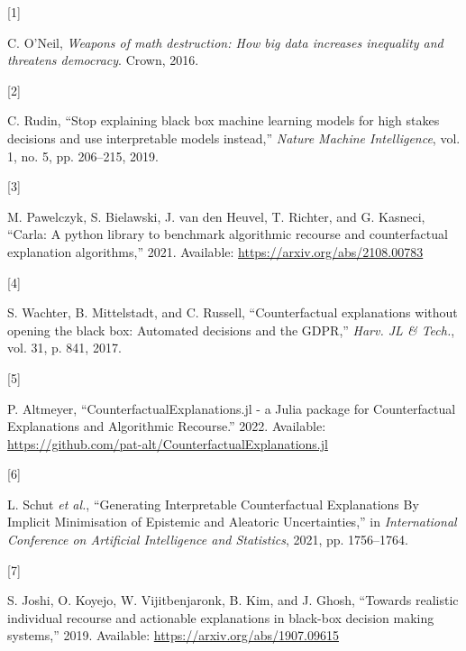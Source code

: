 \documentclass[conference,final,]{IEEEtran}
\newlength{\cslhangindent}
\newlength{\csllabelwidth}
\newlength{\cslentryspacingunit} %
\newenvironment{CSLReferences}[2] %
 {%
  \setlength{\parindent}{0pt}
  \ifodd #1
  \let\oldpar\par
  \def\par{\hangindent=\cslhangindent\oldpar}
  \fi
  \setlength{\parskip}{#2\cslentryspacingunit}
 }%
 {}
\newcommand{\CSLLeftMargin}[1]{\parbox[t]{\csllabelwidth}{#1}}
\newcommand{\CSLRightInline}[1]{\parbox[t]{\linewidth - \csllabelwidth}{#1}\break}
\theoremstyle{definition}
\theoremstyle{definition}
\theoremstyle{definition}
\theoremstyle{definition}
\theoremstyle{remark}
\begin{document}
\hypertarget{refs}{}
\begin{CSLReferences}{0}{0}
\leavevmode{}%
\CSLLeftMargin{{[}1{]} }%
\CSLRightInline{C. O'Neil, \emph{Weapons of math destruction: {How} big data increases inequality and threatens democracy}. {Crown}, 2016.}

\leavevmode{}%
\CSLLeftMargin{{[}2{]} }%
\CSLRightInline{C. Rudin, {``Stop explaining black box machine learning models for high stakes decisions and use interpretable models instead,''} \emph{Nature Machine Intelligence}, vol. 1, no. 5, pp. 206--215, 2019.}

\leavevmode{}%
\CSLLeftMargin{{[}3{]} }%
\CSLRightInline{M. Pawelczyk, S. Bielawski, J. van den Heuvel, T. Richter, and G. Kasneci, {``Carla: A python library to benchmark algorithmic recourse and counterfactual explanation algorithms,''} 2021. Available: \url{https://arxiv.org/abs/2108.00783}}

\leavevmode{}%
\CSLLeftMargin{{[}4{]} }%
\CSLRightInline{S. Wachter, B. Mittelstadt, and C. Russell, {``Counterfactual explanations without opening the black box: {Automated} decisions and the {GDPR},''} \emph{Harv. JL \& Tech.}, vol. 31, p. 841, 2017.}

\leavevmode{}%
\CSLLeftMargin{{[}5{]} }%
\CSLRightInline{P. Altmeyer, {``{CounterfactualExplanations}.jl - a {Julia} package for {Counterfactual Explanations} and {Algorithmic Recourse}.''} 2022. Available: \url{https://github.com/pat-alt/CounterfactualExplanations.jl}}

\leavevmode{}%
\CSLLeftMargin{{[}6{]} }%
\CSLRightInline{L. Schut \emph{et al.}, {``Generating {Interpretable Counterfactual Explanations By Implicit Minimisation} of {Epistemic} and {Aleatoric Uncertainties},''} in \emph{International {Conference} on {Artificial Intelligence} and {Statistics}}, 2021, pp. 1756--1764.}

\leavevmode{}%
\CSLLeftMargin{{[}7{]} }%
\CSLRightInline{S. Joshi, O. Koyejo, W. Vijitbenjaronk, B. Kim, and J. Ghosh, {``Towards realistic individual recourse and actionable explanations in black-box decision making systems,''} 2019. Available: \url{https://arxiv.org/abs/1907.09615}}


\end{CSLReferences}
\end{document}
